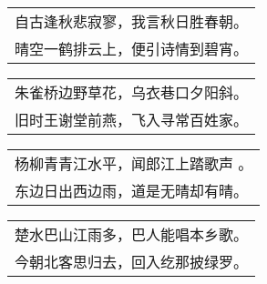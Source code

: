 \nopagebreak%
\nopagebreak%
\noindent\begin{minipage}{\linewidth}
  \vskip-3pt\begin{table}[H]
    \centering
    \begin{tabular}{@{}l@{}}
自古逢秋悲寂寥，我言秋日胜春朝。\\
晴空一鹤排云上，便引诗情到碧宵。
    \end{tabular}
  \end{table}
\end{minipage}
\vspace{1cm}


\nopagebreak%
\nopagebreak%
\noindent\begin{minipage}{\linewidth}
  \vskip-3pt\begin{table}[H]
    \centering
    \begin{tabular}{@{}l@{}}
朱雀桥边野草花，乌衣巷口夕阳斜。\\
旧时王谢堂前燕，飞入寻常百姓家。
    \end{tabular}
  \end{table}
\end{minipage}
\vspace{1cm}


\nopagebreak%
\nopagebreak%
\noindent\begin{minipage}{\linewidth}
  \vskip-3pt\begin{table}[H]
    \centering
    \begin{tabular}{@{}l@{}}
杨柳青青江水平，闻郎江上踏歌声 。\\
东边日出西边雨，道是无晴却有晴。
    \end{tabular}
  \end{table}
\end{minipage}
\vspace{1cm}


\nopagebreak%
\nopagebreak%
\noindent\begin{minipage}{\linewidth}
  \vskip-3pt\begin{table}[H]
    \centering
    \begin{tabular}{@{}l@{}}
楚水巴山江雨多，巴人能唱本乡歌。\\
今朝北客思归去，回入纥那披绿罗。
    \end{tabular}
  \end{table}
\end{minipage}
\vspace{1cm}


